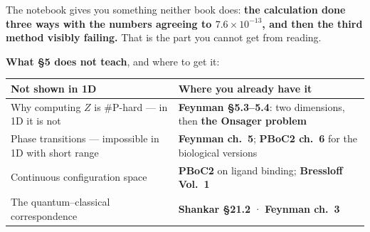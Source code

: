 \begin{keyidea}[title={What §5 of this dossier adds, and what it does not}]
The notebook gives you something neither book does: \textbf{the calculation done three ways with the
numbers agreeing to $7.6\times10^{-13}$, and then the third method visibly failing.} That is the part
you cannot get from reading.

\textbf{What §5 does not teach}, and where to get it:
\begin{center}\small
\begin{tabular}{@{}>{\raggedright\arraybackslash}p{7.4cm}>{\raggedright\arraybackslash}p{9.0cm}@{}}
\toprule
\rowcolor{tenso!12}
\textbf{Not shown in 1D} & \textbf{Where you already have it}\\
\midrule
Why computing $Z$ is \#P-hard --- in 1D it is not & \textbf{Feynman §5.3--5.4}: two dimensions, then \textbf{the Onsager problem}\\
Phase transitions --- impossible in 1D with short range & \textbf{Feynman ch.~5}; \textbf{PBoC2 ch.~6} for the biological versions\\
Continuous configuration space & \textbf{PBoC2} on ligand binding; \textbf{Bressloff Vol.~1}\\
The quantum--classical correspondence & \textbf{Shankar §21.2} · \textbf{Feynman ch.~3}\\
\bottomrule
\end{tabular}
\end{center}
\end{keyidea}
